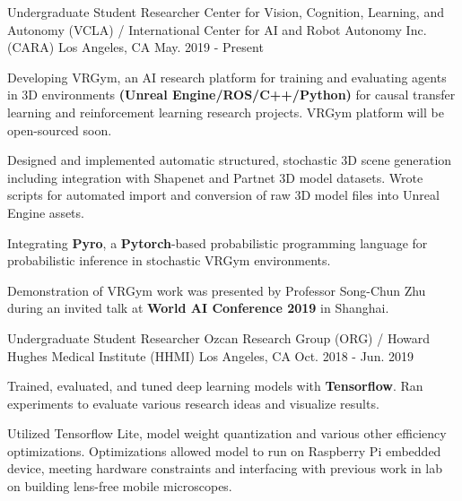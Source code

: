 

\begin{cventries}

  \cventry
    {Undergraduate Student Researcher}
    {Center for Vision, Cognition, Learning, and Autonomy (VCLA) / \newline
    International Center for AI and Robot Autonomy Inc. (CARA)} %
    {Los Angeles, CA} %
    {May. 2019 - Present} %
    {
    \begin{cvitems} %
        \item {Developing VRGym, an AI research platform for training and evaluating agents in
        3D environments \textbf{(Unreal Engine/ROS/C++/Python)} for causal transfer learning and 
        reinforcement learning research projects. VRGym platform will be open-sourced soon.} 
        \item {Designed and implemented automatic structured, stochastic 3D scene generation including integration with Shapenet and Partnet 
        3D model datasets. 
        Wrote scripts for automated import and conversion of raw 3D model files into Unreal Engine assets.}
        \item {Integrating \textbf{Pyro}, a \textbf{Pytorch}-based probabilistic programming language for probabilistic inference in stochastic VRGym environments.}
        \item {Demonstration of VRGym work was presented by Professor Song-Chun Zhu during an invited talk at \textbf{World AI Conference 2019} in Shanghai.}
    \end{cvitems}
    }

  

  \cventry
  {Undergraduate Student Researcher}
  {Ozcan Research Group (ORG) / Howard Hughes Medical Institute (HHMI)} %
  {Los Angeles, CA} %
  {Oct. 2018 - Jun. 2019} %
  {
    \begin{cvitems} %
      \item {Trained, evaluated, and tuned deep learning models with \textbf{Tensorflow}. Ran 
      experiments to evaluate various research ideas and visualize results.}
      \item Utilized Tensorflow Lite, model weight quantization and various other efficiency optimizations. Optimizations 
      allowed model to run on Raspberry Pi embedded device, meeting hardware constraints and interfacing with 
      previous work in lab on building lens-free mobile microscopes.
    \end{cvitems}
  }

  
\end{cventries}
